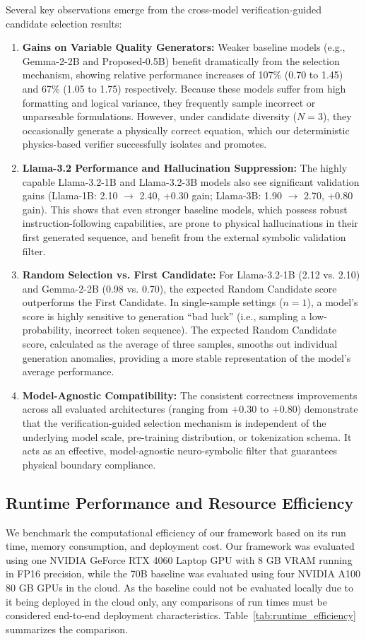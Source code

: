\documentclass[a4paper,fleqn]{cas-sc}
\begin{document}
Several key observations emerge from the cross-model verification-guided candidate selection results:
\begin{enumerate}
    \item \textbf{Gains on Variable Quality Generators:} Weaker baseline models (e.g., Gemma-2-2B and Proposed-0.5B) benefit dramatically from the selection mechanism, showing relative performance increases of 107\% (0.70 to 1.45) and 67\% (1.05 to 1.75) respectively. Because these models suffer from high formatting and logical variance, they frequently sample incorrect or unparseable formulations. However, under candidate diversity ($N=3$), they occasionally generate a physically correct equation, which our deterministic physics-based verifier successfully isolates and promotes.
    \item \textbf{Llama-3.2 Performance and Hallucination Suppression:} The highly capable Llama-3.2-1B and Llama-3.2-3B models also see significant validation gains (Llama-1B: 2.10 $\rightarrow$ 2.40, +0.30 gain; Llama-3B: 1.90 $\rightarrow$ 2.70, +0.80 gain). This shows that even stronger baseline models, which possess robust instruction-following capabilities, are prone to physical hallucinations in their first generated sequence, and benefit from the external symbolic validation filter.
    \item \textbf{Random Selection vs. First Candidate:} For Llama-3.2-1B (2.12 vs. 2.10) and Gemma-2-2B (0.98 vs. 0.70), the expected Random Candidate score outperforms the First Candidate. In single-sample settings ($n=1$), a model's score is highly sensitive to generation ``bad luck'' (i.e., sampling a low-probability, incorrect token sequence). The expected Random Candidate score, calculated as the average of three samples, smooths out individual generation anomalies, providing a more stable representation of the model's average performance.
    \item \textbf{Model-Agnostic Compatibility:} The consistent correctness improvements across all evaluated architectures (ranging from +0.30 to +0.80) demonstrate that the verification-guided selection mechanism is independent of the underlying model scale, pre-training distribution, or tokenization schema. It acts as an effective, model-agnostic neuro-symbolic filter that guarantees physical boundary compliance.
\end{enumerate}

\subsection{Runtime Performance and Resource Efficiency}
We benchmark the computational efficiency of our framework based on its run time, memory consumption, and deployment cost. Our framework was evaluated using one NVIDIA GeForce RTX 4060 Laptop GPU with 8 GB VRAM running in FP16 precision, while the 70B baseline was evaluated using four NVIDIA A100 80 GB GPUs in the cloud. As the baseline could not be evaluated locally due to it being deployed in the cloud only, any comparisons of run times must be considered end-to-end deployment characteristics. Table~\ref{tab:runtime_efficiency} summarizes the comparison.
\end{document}
